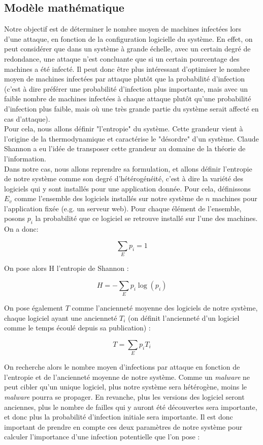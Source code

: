 \subsection{Modèle mathématique}\label{sec:modelMath}

Notre objectif est de déterminer le nombre moyen de machines infectées lors d'une attaque, en fonction de la configuration logicielle du système. En effet, on peut considérer que dans un système à grande échelle, avec un certain degré de redondance, une attaque n'est concluante que si un certain pourcentage des machines a été infecté. Il peut donc être plus intéressant d'optimiser le nombre moyen de machines infectées par attaque plutôt que la probabilité d'infection (c'est à dire préférer une probabilité d'infection plus importante, mais avec un faible nombre de machines infectées à chaque attaque plutôt qu'une probabilité d'infection plus faible, mais où une très grande partie du système serait affecté en cas d'attaque).\\
Pour cela, nous allons définir "l'entropie" du système. Cette grandeur vient à l'origine de la thermodynamique et caractérise le "désordre" d'un système. Claude Shannon a eu l'idée de transposer cette grandeur au domaine de la théorie de l'information\cite{entropie_shannon}.\\
Dans notre cas, nous allons reprendre sa formulation, et allons définir l'entropie de notre système comme son degré d'hétérogénéité, c'est à dire la variété des logiciels qui y sont installés pour une application donnée.
Pour cela, définissons $E_v$ comme l'ensemble des logiciels installés sur notre système de $n$ machines pour l'application fixée (e.g. un serveur web). Pour chaque élément de l'ensemble, posons $p_i$ la probabilité que ce logiciel se retrouve installé sur l'une des machines. 
On a donc:

\[
\sum_{E}p_i=1
\]

On pose alors H l'entropie de Shannon :

\[
H=-\sum_E p_i \log(p_i)
\]

On pose également $T$ comme l'ancienneté moyenne des logiciels de notre système, chaque logiciel ayant une ancienneté $T_i$ (on définit l'ancienneté d'un logiciel comme le temps écoulé depuis sa publication)  :

\[
T=\sum_E p_i T_i
\]

On recherche alors le nombre moyen d'infections par attaque en fonction de l'entropie et de l'ancienneté moyenne de notre système. Comme un \textit{malware} ne peut cibler qu'un unique logiciel, plus notre système sera hétérogène, moins le \textit{malware} pourra se propager. En revanche, plus les versions des logiciel seront anciennes, plus le nombre de failles qui y auront été découvertes sera importante, et donc plus la probabilité d'infection initiale sera importante. Il est donc important de prendre en compte ces deux paramètres de notre système pour calculer l'importance d'une infection potentielle que l'on pose : 

